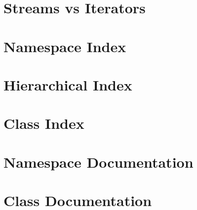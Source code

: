 \documentclass[twoside]{book}
\newcommand{\+}{\discretionary{\mbox{\scriptsize$\hookleftarrow$}}{}{}}
\newcommand{\clearemptydoublepage}{%
  \newpage{\pagestyle{empty}\cleardoublepage}%
}
\begin{document}
\chapter{Streams vs Iterators}
\label{md__home_ruoso_devel_u5e_StreamVsIterators}
\hypertarget{md__home_ruoso_devel_u5e_StreamVsIterators}{}

\chapter{Namespace Index}

\chapter{Hierarchical Index}

\chapter{Class Index}

\chapter{Namespace Documentation}




\chapter{Class Documentation}


































\backmatter
\newpage
{}
\clearemptydoublepage
{}
\printindex
\end{document}
